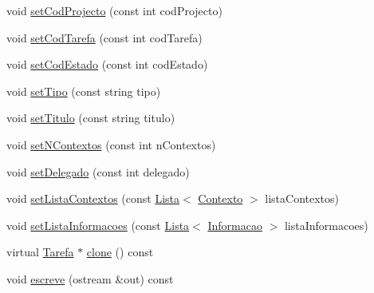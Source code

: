 \begin{DoxyCompactItemize}
\item 
void \hyperlink{class_tarefa_a5ceaa94834a79f8351251957e787935d}{set\-Cod\-Projecto} (const int cod\-Projecto)
\item 
void \hyperlink{class_tarefa_a0790290eb8a761c1f04b8360f6738ab8}{set\-Cod\-Tarefa} (const int cod\-Tarefa)
\item 
void \hyperlink{class_tarefa_aea61452df9fe8527a06e4011b32900b6}{set\-Cod\-Estado} (const int cod\-Estado)
\item 
void \hyperlink{class_tarefa_a92053bb006b14ff49c750fc501f5f7ae}{set\-Tipo} (const string tipo)
\item 
void \hyperlink{class_tarefa_aaf5068c9185713d4ab04961f4e80c58d}{set\-Titulo} (const string titulo)
\item 
void \hyperlink{class_tarefa_a27ca7f4fa898681235a1cbd031c9a402}{set\-N\-Contextos} (const int n\-Contextos)
\item 
void \hyperlink{class_tarefa_a63dab5133df402c70eb3f513162a5c82}{set\-Delegado} (const int delegado)
\item 
void \hyperlink{class_tarefa_ab80857f9703d8d27fd1adcc36a84a601}{set\-Lista\-Contextos} (const \hyperlink{class_lista}{Lista}$<$ \hyperlink{class_contexto}{Contexto} $>$ lista\-Contextos)
\item 
void \hyperlink{class_tarefa_a620e4d48dfa6698aaccb74d40c8e6e96}{set\-Lista\-Informacoes} (const \hyperlink{class_lista}{Lista}$<$ \hyperlink{class_informacao}{Informacao} $>$ lista\-Informacoes)
\item 
virtual \hyperlink{class_tarefa}{Tarefa} $\ast$ \hyperlink{class_tarefa_a24ddead3a39186738160bde7f7f7dfe6}{clone} () const 
\item 
void \hyperlink{class_tarefa_a4c590b4c84b0cc12c57581c7f1912bfa}{escreve} (ostream \&out) const 
\end{DoxyCompactItemize}


